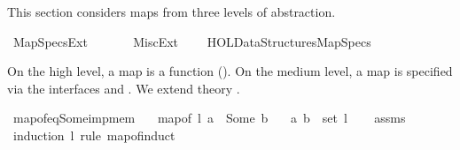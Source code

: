 %
\begin{isabellebody}%
%
%
\isadelimdocument
%
\endisadelimdocument
%
\isatagdocument
%
\isamarkuptrue%
%
\endisatagdocument
{\isafolddocument}%
%
\isadelimdocument
%
\endisadelimdocument
%
\begin{isamarkuptext}%
This section considers maps from three levels of abstraction.%
\end{isamarkuptext}\isamarkuptrue%
%
\isadelimtheory
%
\endisadelimtheory
%
\isatagtheory
{}\isamarkupfalse%
\ Map{\isacharunderscore}{\kern0pt}Specs{\isacharunderscore}{\kern0pt}Ext\isanewline
\ \ \isanewline
\ \ \ \ {\isachardoublequoteopen}{\isachardot}{\kern0pt}{\isachardot}{\kern0pt}{\isacharslash}{\kern0pt}Misc{\isacharunderscore}{\kern0pt}Ext{\isachardoublequoteclose}\isanewline
\ \ \ \ {\isachardoublequoteopen}HOL{\isacharminus}{\kern0pt}Data{\isacharunderscore}{\kern0pt}Structures{\isachardot}{\kern0pt}Map{\isacharunderscore}{\kern0pt}Specs{\isachardoublequoteclose}\isanewline
{}%
\endisatagtheory
{\isafoldtheory}%
%
\isadelimtheory
%
\endisadelimtheory
%
\begin{isamarkuptext}%
On the high level, a map is a function (). On the medium level, a map is specified via
the interfaces  and . We extend theory
.%
\end{isamarkuptext}\isamarkuptrue%
\isamarkupfalse%
\ map{\isacharunderscore}{\kern0pt}of{\isacharunderscore}{\kern0pt}eq{\isacharunderscore}{\kern0pt}Some{\isacharunderscore}{\kern0pt}imp{\isacharunderscore}{\kern0pt}mem{\isacharcolon}{\kern0pt}\isanewline
\ \ \ {\isachardoublequoteopen}map{\isacharunderscore}{\kern0pt}of\ l\ a\ {\isacharequal}{\kern0pt}\ Some\ b{\isachardoublequoteclose}\isanewline
\ \ \ {\isachardoublequoteopen}{\isacharparenleft}{\kern0pt}a{\isacharcomma}{\kern0pt}\ b{\isacharparenright}{\kern0pt}\ {\isasymin}\ set\ l{\isachardoublequoteclose}\isanewline
%
\isadelimproof
\ \ %
\endisadelimproof
%
\isatagproof
{}\isamarkupfalse%
\ assms\isanewline
{}\isamarkupfalse%
\ {\isacharparenleft}{\kern0pt}induction\ l\ rule{\isacharcolon}{\kern0pt}\ map{\isacharunderscore}{\kern0pt}of{\isachardot}{\kern0pt}induct{\isacharparenright}{\kern0pt}\isanewline

\end{isabellebody}
